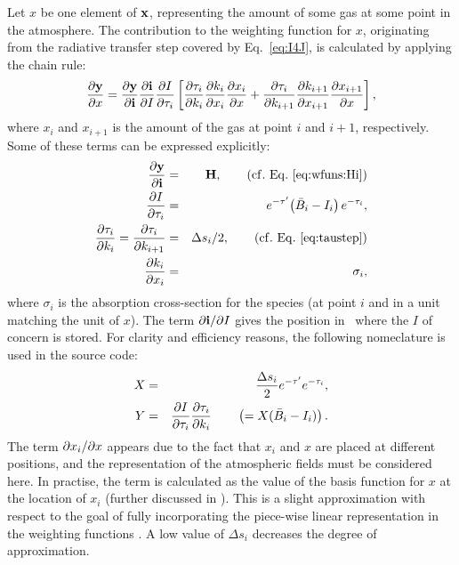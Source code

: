 Let $x$ be one element of $\mathbf{x}$, representing the amount of
some gas at some point in the atmosphere. The contribution to the weighting
function for $x$, originating from the radiative transfer step covered by
Eq.~\ref{eq:I4J}, is calculated by applying the chain rule:
\begin{equation}
  \label{eq:chainrule}
  \frac{\partial \mathbf{y}}{\partial x} =  
  \frac{\partial \mathbf{y}}{\partial \mathbf{i}}
  \frac{\partial \mathbf{i}}{\partial I} \frac{\partial I}{\partial \tau_{i}}
  \left[\frac{\partial \tau_{i}}{\partial k_i}\frac{\partial k_i}{\partial x_i} 
        \frac{\partial x_i}{\partial x} +
        \frac{\partial \tau_{i}}{\partial k_{i+1}}\frac{\partial k_{i+1}}{\partial x_{i+1}}
        \frac{\partial x_{i+1}}{\partial x} \right],
\end{equation}
where $x_i$ and $x_{i+1}$ is the amount of the gas at point $i$ and $i+1$,
respectively. Some of these terms can be expressed explicitly:
\begin{eqnarray}
  \frac{\PartD \MsrVct}{\PartD \MpiVct} &=& \SnsMtr,
               \qquad \mathrm{(cf.\ Eq.\ \ref{eq:wfuns:Hi})} \\
  \frac{\PartD I}{\PartD \aOth{i}} 
      &=& e^{-\Oth'}\!\left( \bar{B}_i-I_i\right)e^{-\aOth{i}}, \\
  \frac{\PartD \aOth{i}}{\PartD k_i}=\frac{\PartD \aOth{i}}{\PartD k_{i+1}} 
      &=& \Delta s_i/2, \qquad \mathrm{(cf.\ Eq.\ \ref{eq:taustep})} \\
  \frac{\PartD k_i}{\PartD x_i}
      &=& \sigma_i, 
\end{eqnarray}
where $\sigma_i$ is the absorption cross-section for the species (at point $i$
and in a unit matching the unit of $x$). The term $\partial \mathbf{i}/\partial I$
gives the position in \MpiVct\ where the $I$ of concern is stored. For clarity
and efficiency reasons, the following nomeclature is used in the source code:
\begin{eqnarray}
  X &=& \frac{\Delta s_i}{2} e^{-\tau'} e^{-\tau_{i}}, \\
  Y &=& \frac{\partial I}{\partial \tau_{i}}\frac{\partial \tau_{i}}{\partial k_i}
    \qquad \left( = X(\bar{B}_i-I_i) \right).
\end{eqnarray}
The term $\partial x_i/\partial x$ appears due to the fact that $x_i$ and $x$ are
placed at different positions, and the representation of the atmospheric fields
must be considered here. In practise, the term is calculated as the value of
the basis function for $x$ at the location of $x_i$ (further discussed in
\citet{buehler:artst:05}). This is a slight approximation with respect to the
goal of fully incorporating the piece-wise linear representation in the
weighting functions \citep{buehler:artst:05}. A low value of $\Delta s_i$
decreases the degree of approximation.

